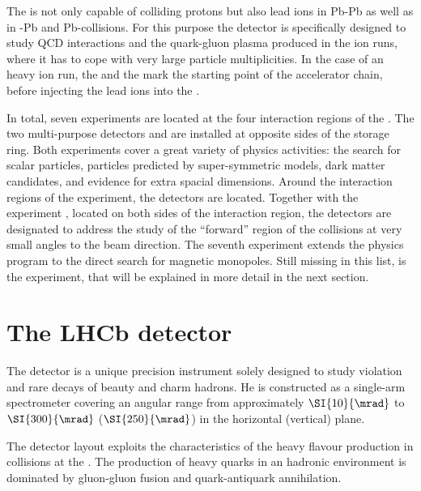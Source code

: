 The \LHC is not only capable of colliding protons but also lead ions in Pb-Pb
as well as in \proton-Pb and Pb-\proton collisions. For this purpose the \ALICE
detector \cite{Aamodt:2008zz} is specifically designed to study QCD interactions
and the quark-gluon plasma produced in the \LHC ion runs, where it has to cope
with very large particle multiplicities. In the case of an heavy ion run, the
\LINACThree and the \LEIR mark the starting point of the accelerator chain,
before injecting the lead ions into the \PSyn.

In total, seven experiments are located at the four interaction regions of the
\LHC. The two multi-purpose detectors \ATLAS \cite{Aad:2008zzm} and \CMS
\cite{Chatrchyan:2008aa} are installed at opposite sides of the storage ring.
Both experiments cover a great variety of physics activities: the search for
scalar particles, particles predicted by super-symmetric models, dark matter
candidates, and evidence for extra spacial dimensions. Around the interaction
regions of the \CMS experiment, the \TOTEM detectors \cite{Anelli:2008zza} are
located. Together with the \LHCf experiment \cite{Adriani:2008zz}, located on
both sides of the \ATLAS interaction region, the detectors are designated to
address the study of the \enquote{forward} region of the collisions at very
small angles to the beam direction. The seventh experiment \MoEDAL extends the
\LHC physics program to the direct search for magnetic monopoles. Still missing
in this list, is the \LHCb experiment, that will be explained in more detail in
the next section.


\section{The LHCb detector}
\label{ch:lhcb_experiment:detector}

The \LHCb detector is a unique precision instrument solely designed to study \CP
violation and rare decays of beauty and charm hadrons. He is constructed as a
single-arm spectrometer covering an angular range from approximately
$\SI{10}{\mrad}$ to $\SI{300}{\mrad}$ ($\SI{250}{\mrad}$) in the
horizontal (vertical) plane.

The detector layout exploits the characteristics of the heavy flavour production
in \protonproton collisions at the \LHC. The production of heavy quarks in an hadronic environment is dominated by gluon-gluon fusion and quark-antiquark annihilation. 




